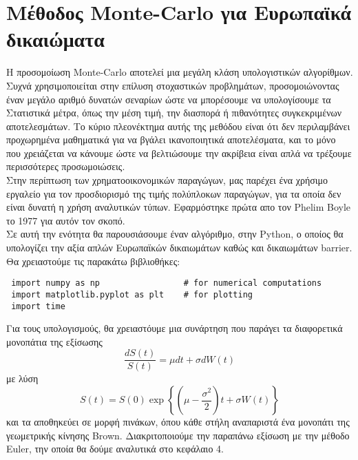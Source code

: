 \documentclass[12pt,a4paper,twoside,openany]{book}
\begin{document}
\section{Μέθοδος Monte-Carlo για Ευρωπαϊκά δικαιώματα} 	
\vspace{2.5mm}	
 	Η προσομοίωση Monte-Carlo αποτελεί μια μεγάλη κλάση υπολογιστικών αλγορίθμων. Συχνά χρησιμοποιείται στην επίλυση στοχαστικών προβλημάτων, προσομοιώνοντας έναν μεγάλο αριθμό δυνατών σεναρίων ώστε να μπορέσουμε να υπολογίσουμε τα Στατιστικά μέτρα, όπως την μέση τιμή, την διασπορά ή πιθανότητες συγκεκριμένων αποτελεσμάτων. Το κύριο πλεονέκτημα αυτής της μεθόδου είναι ότι δεν περιλαμβάνει προχωρημένα μαθηματικά για να βγάλει ικανοποιητικά αποτελέσματα, και το μόνο που χρειάζεται να κάνουμε ώστε να βελτιώσουμε την ακρίβεια είναι απλά να τρέξουμε περισσότερες προσωμοιώσεις.
 	\vspace{2.5mm}\\
 	Στην περίπτωση των χρηματοοικονομικών παραγώγων,  μας παρέχει ένα χρήσιμο εργαλείο για τον προσδιορισμό της τιμής πολύπλοκων παραγώγων, για τα οποία δεν είναι δυνατή η χρήση αναλυτικών τύπων. Εφαρμόστηκε πρώτα απο τον Phelim Boyle το 1977 για αυτόν τον σκοπό.
 	\vspace{2.5mm}\\
 	Σε αυτή την ενότητα θα παρουσιάσουμε έναν αλγόριθμο, στην Python, ο οποίος θα υπολογίζει την αξία απλών Ευρωπαϊκών δικαιωμάτων καθώς και δικαιωμάτων  barrier.
 	\vspace{2.5mm}\\
 	Θα χρειαστούμε τις παρακάτω  βιβλιοθήκες:
 	\vspace{4mm}
\begin{lstlisting}
 import numpy as np					# for numerical computations
 import matplotlib.pyplot as plt	# for plotting
 import time \end{lstlisting}		
 \vspace{4mm}
 Για τους υπολογισμούς, θα χρειαστόυμε μια συνάρτηση που παράγει τα διαφορετικά μονοπάτια της εξίσωσης
 \[\frac{dS(t)}{S(t)}= \mu dt + \sigma dW(t)\]
 με λύση
 \[S(t)= S(0)\exp\left\{ \left(\mu-\frac{\sigma^2}{2}\right)t +\sigma W(t)\right\} \]
 και τα αποθηκεύει σε μορφή πινάκων, όπου κάθε στήλη αναπαριστά ένα μονοπάτι της γεωμετρικής κίνησης Brown. Διακριτοποιούμε την παραπάνω εξίσωση με την μέθοδο Euler, την οποία θα δούμε αναλυτικά στο κεφάλαιο 4.
\end{document}

